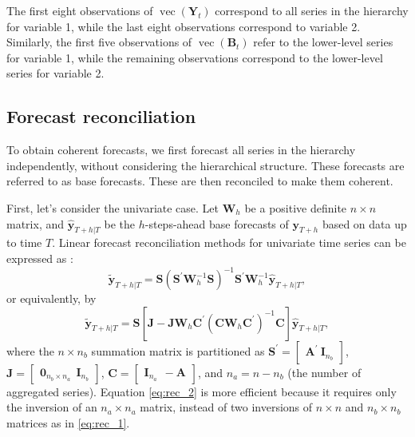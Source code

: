 \documentclass[a4paper,preprint,11pt,authoryear]{elsarticle}
\DeclareMathOperator{\vetor}{vec}
\begin{document}
The first eight observations of $\vetor(\bm{Y}_t)$ correspond to all series in the hierarchy for variable 1, while the last eight observations correspond to variable 2. Similarly, the first five observations of $\vetor(\bm{B}_t)$ refer to the lower-level series for variable 1, while the remaining observations correspond to the lower-level series for variable 2.

\subsection{Forecast reconciliation}
\label{{Reconciliação multivariada}}

To obtain coherent forecasts, we first forecast all series in the hierarchy independently, without considering the hierarchical structure. These forecasts are referred to as base forecasts. These are then reconciled to make them coherent.

First, let's consider the univariate case. Let $\bm{W}_h$ be a positive definite $n \times n$ matrix, and $\widehat{\bm{y}}_{T+h|T}$ be the $h$-steps-ahead base forecasts of $\bm{y}_{T+h}$ based on data up to time $T$. Linear forecast reconciliation methods for univariate time series can be expressed as \citep{wickramasuriya2019optimal}:
\begin{equation}
  \widetilde{\bm{y}}_{T+h|T} = \bm{S}(\bm{S}^\prime \bm{W}_h^{-1}\bm{S})^{-1}\bm{S}^\prime\bm{W}_h^{-1}\widehat{\bm{y}}_{T+h|T},
  \label{eq:rec_1}
\end{equation}
or equivalently, by
\begin{equation}
  \widetilde{\bm{y}}_{T+h|T} = \bm{S}[\bm{J} - \bm{J}\bm{W}_h\bm{C}^\prime(\bm{C}\bm{W}_h\bm{C}^\prime)^{-1}\bm{C}]\widehat{\bm{y}}_{T+h|T},
  \label{eq:rec_2}
\end{equation}
where the $n \times n_b$ summation matrix is partitioned as $\bm{S}^\prime =
\begin{bmatrix} \bm{A}^\prime \ \bm{I}_{n_b}
\end{bmatrix}$, $\bm{J} =
\begin{bmatrix} \bm{0}_{n_b \times n_a} \ \ \bm{I}_{n_b}
\end{bmatrix}$, $\bm{C} =
\begin{bmatrix} \bm{I}_{n_a} \ \ -\bm{A}
\end{bmatrix}$, and $n_a = n - n_b$ (the number of aggregated series).
Equation \eqref{eq:rec_2} is more efficient because it requires only the inversion of an $n_a \times n_a$ matrix, instead of two inversions of $n \times n$ and $n_b \times n_b$ matrices as in \eqref{eq:rec_1}.
\end{document}
